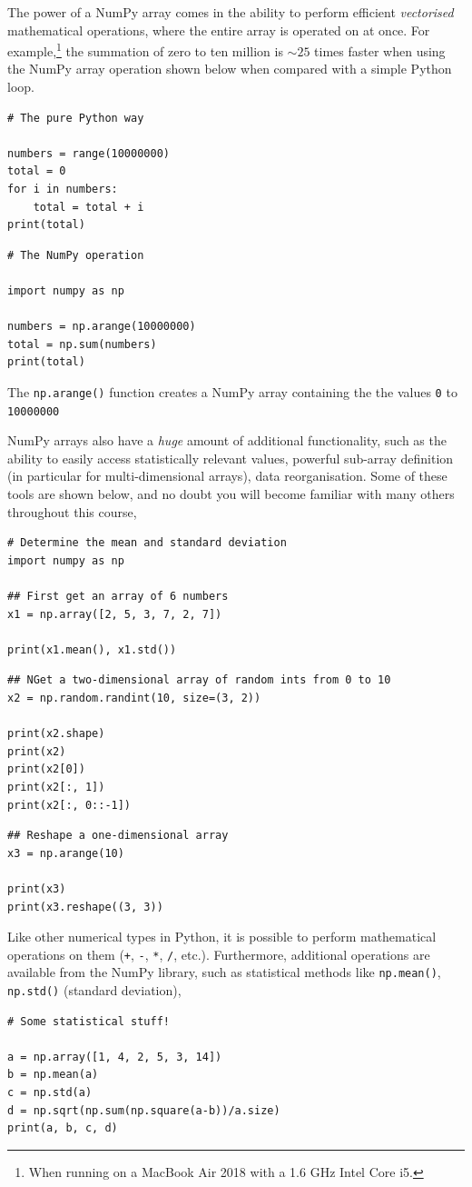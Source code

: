 \documentclass[a4paper]{article}
\begin{document}
The power of a NumPy array comes in the ability to perform efficient \emph{vectorised} mathematical operations, where the entire array is operated on at once.
For example,\footnote{When running on a MacBook Air 2018 with a 1.6 GHz Intel Core i5.} the summation of zero to ten million is $\sim 25$ times faster when using the NumPy array operation shown below when compared with a simple Python loop.
\begin{lstlisting}
# The pure Python way

numbers = range(10000000)
total = 0
for i in numbers:
    total = total + i
print(total)
\end{lstlisting}
\begin{lstlisting}
# The NumPy operation

import numpy as np

numbers = np.arange(10000000)
total = np.sum(numbers)
print(total)
\end{lstlisting}
The \texttt{np.arange()} function creates a NumPy array containing the the values \texttt{0} to \texttt{10000000}

NumPy arrays also have a \emph{huge} amount of additional functionality, such as the ability to easily access statistically relevant values, powerful sub-array definition (in particular for multi-dimensional arrays), data reorganisation.
Some of these tools are shown below, and no doubt you will become familiar with many others throughout this course,
\begin{lstlisting}
# Determine the mean and standard deviation
import numpy as np

## First get an array of 6 numbers
x1 = np.array([2, 5, 3, 7, 2, 7])

print(x1.mean(), x1.std())
\end{lstlisting}

\begin{lstlisting}
## NGet a two-dimensional array of random ints from 0 to 10
x2 = np.random.randint(10, size=(3, 2))

print(x2.shape)
print(x2)
print(x2[0])
print(x2[:, 1])
print(x2[:, 0::-1])
\end{lstlisting}

\begin{lstlisting}
## Reshape a one-dimensional array
x3 = np.arange(10)

print(x3)
print(x3.reshape((3, 3))
\end{lstlisting}

Like other numerical types in Python, it is possible to perform mathematical operations on them (\texttt{+}, \texttt{-}, \texttt{*}, \texttt{/}, etc.).
Furthermore, additional operations are available from the NumPy library, such as statistical methods like \texttt{np.mean()}, \texttt{np.std()} (standard deviation),
\begin{lstlisting}
# Some statistical stuff!

a = np.array([1, 4, 2, 5, 3, 14])
b = np.mean(a)
c = np.std(a)
d = np.sqrt(np.sum(np.square(a-b))/a.size)
print(a, b, c, d)
\end{lstlisting}
\end{document}
